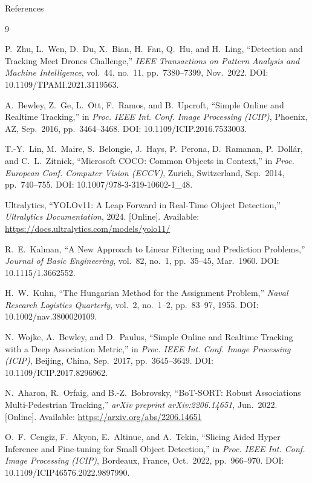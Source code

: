 \documentclass[aspectratio=169]{beamer}
\begin{document}
\begin{frame}[allowframebreaks]{References}
  \footnotesize
  \begin{thebibliography}{9}

    P.~Zhu, L.~Wen, D.~Du, X.~Bian, H.~Fan, Q.~Hu, and H.~Ling,
    ``Detection and Tracking Meet Drones Challenge,''
    \textit{IEEE Transactions on Pattern Analysis and Machine Intelligence},
    vol.~44, no.~11, pp.~7380--7399, Nov.~2022.
    DOI: 10.1109/TPAMI.2021.3119563.

    A.~Bewley, Z.~Ge, L.~Ott, F.~Ramos, and B.~Upcroft,
    ``Simple Online and Realtime Tracking,''
    in \textit{Proc. IEEE Int. Conf. Image Processing (ICIP)},
    Phoenix, AZ, Sep.~2016, pp.~3464--3468.
    DOI: 10.1109/ICIP.2016.7533003.

    T.-Y.~Lin, M.~Maire, S.~Belongie, J.~Hays, P.~Perona, D.~Ramanan,
    P.~Dollár, and C.~L.~Zitnick,
    ``Microsoft COCO: Common Objects in Context,''
    in \textit{Proc. European Conf. Computer Vision (ECCV)},
    Zurich, Switzerland, Sep.~2014, pp.~740--755.
    DOI: 10.1007/978-3-319-10602-1\_48.

    Ultralytics,
    ``YOLOv11: A Leap Forward in Real-Time Object Detection,''
    \textit{Ultralytics Documentation}, 2024.
      [Online]. Available: \url{https://docs.ultralytics.com/models/yolo11/}

    R.~E.~Kalman,
    ``A New Approach to Linear Filtering and Prediction Problems,''
    \textit{Journal of Basic Engineering},
    vol.~82, no.~1, pp.~35--45, Mar.~1960.
    DOI: 10.1115/1.3662552.

    H.~W.~Kuhn,
    ``The Hungarian Method for the Assignment Problem,''
    \textit{Naval Research Logistics Quarterly},
    vol.~2, no.~1--2, pp.~83--97, 1955.
    DOI: 10.1002/nav.3800020109.

    N.~Wojke, A.~Bewley, and D.~Paulus,
    ``Simple Online and Realtime Tracking with a Deep Association Metric,''
    in \textit{Proc. IEEE Int. Conf. Image Processing (ICIP)},
    Beijing, China, Sep.~2017, pp.~3645--3649.
    DOI: 10.1109/ICIP.2017.8296962.

    N.~Aharon, R.~Orfaig, and B.-Z.~Bobrovsky,
    ``BoT-SORT: Robust Associations Multi-Pedestrian Tracking,''
    \textit{arXiv preprint arXiv:2206.14651}, Jun.~2022.
      [Online]. Available: \url{https://arxiv.org/abs/2206.14651}

    O.~F.~Cengiz, F.~Akyon, E.~Altinuc, and A.~Tekin,
    ``Slicing Aided Hyper Inference and Fine-tuning for
    Small Object Detection,''
    in \textit{Proc. IEEE Int. Conf. Image Processing (ICIP)},
    Bordeaux, France, Oct.~2022, pp.~966--970.
    DOI: 10.1109/ICIP46576.2022.9897990.

  \end{thebibliography}
\end{frame}


\end{document}
